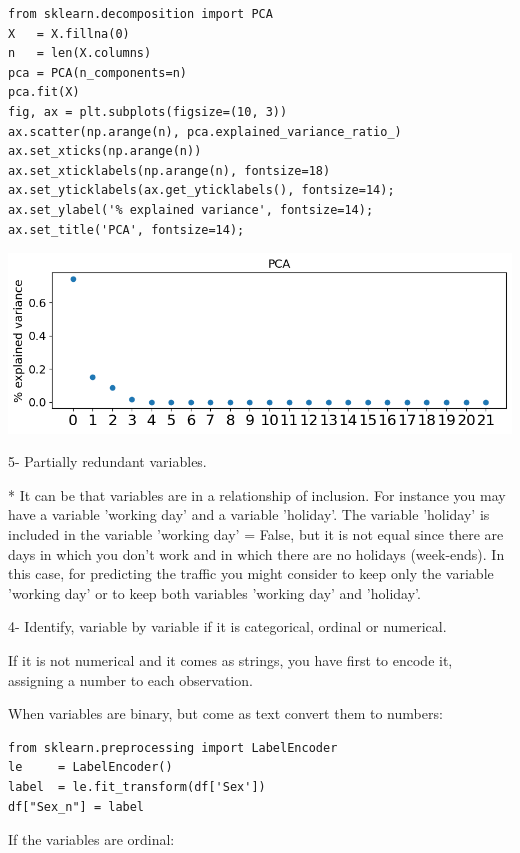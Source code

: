 \documentclass[24pt]{article}
\begin{document}
\begin{lstlisting}
from sklearn.decomposition import PCA
X   = X.fillna(0)
n   = len(X.columns)
pca = PCA(n_components=n)
pca.fit(X)
fig, ax = plt.subplots(figsize=(10, 3))
ax.scatter(np.arange(n), pca.explained_variance_ratio_)
ax.set_xticks(np.arange(n))
ax.set_xticklabels(np.arange(n), fontsize=18)
ax.set_yticklabels(ax.get_yticklabels(), fontsize=14);
ax.set_ylabel('% explained variance', fontsize=14);
ax.set_title('PCA', fontsize=14);
\end{lstlisting}

\begin{center}
\includegraphics[scale = 0.6]{pca.png}
\end{center}




5- Partially redundant variables.


* It can be that variables are in a relationship of inclusion. For instance you may have a variable 'working day' and a variable 'holiday'. The variable 'holiday' is included in the variable 'working day' = False, but it is not equal since there are days in which you don't work and in which there are no holidays (week-ends). In this case, for predicting the traffic you might consider to keep only the variable 'working day' or to keep both variables 'working day' and 'holiday'.




4- Identify, variable by variable if it is categorical,  ordinal or numerical. 

If it is not numerical and it comes as strings, you have first to encode it, assigning a number to each observation. 

When variables are binary, but come as text convert them to numbers:
\begin{lstlisting}
from sklearn.preprocessing import LabelEncoder
le     = LabelEncoder()
label  = le.fit_transform(df['Sex'])
df["Sex_n"] = label
\end{lstlisting}


If the variables are ordinal:
\end{document}
